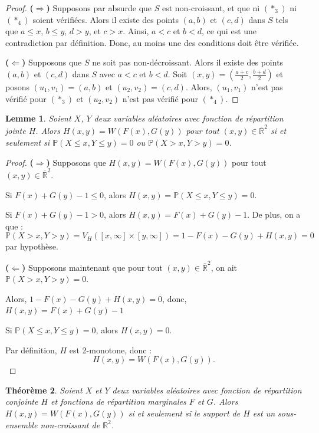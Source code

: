 \documentclass[a4paper,11pt]{amsbook}
\numberwithin{equation}{chapter}
\newtheorem{theoreme}			     {Théorème}	[chapter]
\newtheorem{lemme}	    [theoreme]	 {Lemme}
\theoremstyle{definition}
\begin{document}
\begin{proof}
\textbf{(\(\Rightarrow\))} Supposons par absurde que $S$ est non-croissant, et que ni \((\ast_3)\) ni \((\ast_4)\) soient vérifiées. Alors il existe des points $(a, b)$ et $(c, d)$ dans $S$ tels que $a \leq x$, $b \leq y$, $d > y$, et $c > x$. Ainsi, $a < c$ et $b < d$, ce qui est une contradiction par définition. Donc, au moins une des conditions doit être vérifiée.

\medskip

\textbf{(\(\Leftarrow\))} Supposons que $S$ ne soit pas non-décroissant. Alors il existe des points $(a, b)$ et $(c, d)$ dans $S$ avec $a < c$ et $b < d$. Soit $(x, y) = \left( \frac{a + c}{2}, \frac{b + d}{2} \right)$ et posons $(u_1, v_1) = (a, b)$ et $(u_2, v_2) = (c, d)$. Alors, $(u_1, v_1)$ n’est pas vérifié pour \((\ast_3)\) et $(u_2, v_2)$ n’est pas vérifié pour \((\ast_4)\).
\end{proof}

\begin{lemme}\label{lem:NI_Set2}
Soient $X$, $Y$ deux variables aléatoires avec fonction de répartition jointe $H$. Alors $H(x,y) = W(F(x),G(y))$ pour tout $(x,y) \in \overline{\mathbb{R}}^2$ si et seulement si $\mathbb{P}(X \leq x, Y \leq y) = 0$ ou $\mathbb{P}(X > x, Y > y) = 0$.
\end{lemme}

\begin{proof}
\textbf{(\(\Rightarrow\))} Supposons que $H(x,y) = W(F(x),G(y))$ pour tout $(x,y) \in \overline{\mathbb{R}}^2$. 

Si $F(x)+G(y)-1 \leq 0$, alors $H(x,y) = \mathbb{P}(X \leq x, Y \leq y) = 0$.

Si $F(x)+G(y)-1 > 0$, alors $H(x,y) = F(x)+G(y)-1$. De plus, on a que :
\[
\mathbb{P}(X > x, Y > y) = V_H([x, \infty] \times [y, \infty]) = 1 - F(x) - G(y) + H(x,y) = 0
\]
par hypothèse.

\vspace{0.5em}
\textbf{(\(\Leftarrow\))} Supposons maintenant que pour tout $(x,y) \in \overline{\mathbb{R}}^2$, on ait $\mathbb{P}(X > x, Y > y) = 0$. 

Alors, $1 - F(x) - G(y) + H(x,y) = 0$, donc, $H(x,y) = F(x) + G(y) - 1$

Si $\mathbb{P}(X \leq x, Y \leq y) = 0$, alors $H(x,y) = 0$.

Par définition, $H$ est 2-monotone, donc :
\[
H(x,y) = W(F(x),G(y)).
\]
\end{proof}


\begin{theoreme}\label{thm:NI_Set}
Soient $X$ et $Y$ deux variables aléatoires avec fonction de répartition conjointe $H$ et fonctions de répartition marginales $F$ et $G$. Alors $H(x, y) = W(F(x),G(y))$ si et seulement si le support de $H$ est un sous-ensemble non-croissant de $\mathbb{R}^2$.
\end{theoreme}
\end{document}
